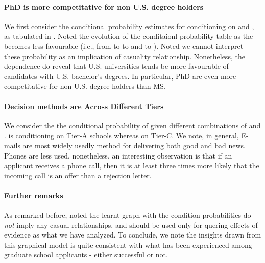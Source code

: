 		\paragraph{PhD is more competitative for non U.S. degree holders}
			We first consider the conditional probability estimates
			for  conditioning on  and , as tabulated
			in . Noted the evolution of the conditaionl probability table
			as the  becomes less favourable (i.e., from  to  to  and to ).
			Noted we cannot interpret these probability as an implication of casuality relationship. Nonetheless,
			the dependence do reveal that U.S. universities tends be more favourable of candidates with
			U.S. bachelor's degrees. In particular, PhD are even more competitative for non U.S. degree holders
			than MS.

		\paragraph{Decision methods are Across Different Tiers}
			We consider the the conditional probability of 
			given different combinations of 
			and .  is conditioning
			on Tier-A schools whereas  on Tier-C.
			We note, in general, E-mails are most widely usedly method
			for delivering both good and bad news. Phones are less used,
			nonetheless, an interesting observation is that if an applicant
			receives a phone call, then it is at least three times more likely
			that the incoming call is an offer than a rejection letter.

		\paragraph{Further remarks}
			As remarked before, noted the learnt graph with the condition probabilities
			do \emph{not} imply any casual relationships, and should be used only for quering
			effects of evidence as what we have analyzed. To conclude, we note the insights
			drawn from this graphical model is quite consistent with what has been experienced among
			graduate school applicants - either successful or not.
